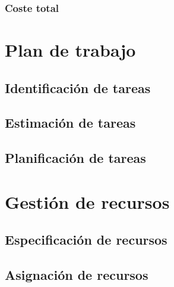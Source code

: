 \documentclass[12pt,a4paper,onecolumn,oneside]{report}
\begin{document}
\subsubsection{Coste total}

\begin{table}[ht]
	\centering
	\caption{Presupuesto total}
	\label{tabla3}
\end{table}

\section{Plan de trabajo}
\label{Plan de trabajo}


\subsection{Identificación de tareas}

\subsection{Estimación de tareas}

\subsection{Planificación de tareas}



\section{Gestión de recursos}

\subsection{Especificación de recursos}

\subsection{Asignación de recursos}
\end{document}
